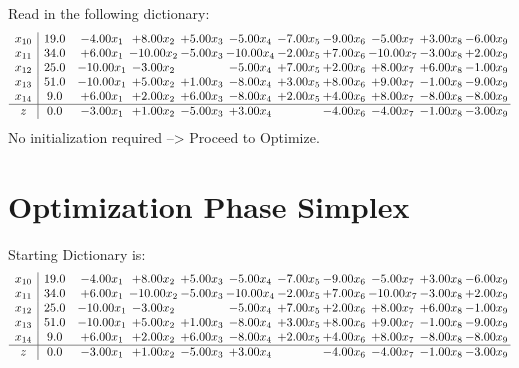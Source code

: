 \documentclass[9pt]{article}
\begin{document}
Read in the following dictionary:
\[\begin{array}{c| c c@{\hskip 2pt} c@{\hskip 2pt} c@{\hskip 2pt} c@{\hskip 2pt} c@{\hskip 2pt} c@{\hskip 2pt} c@{\hskip 2pt} c@{\hskip 2pt} c@{\hskip 2pt} }
 x_{10}   &  19.0 & -4.00 x_{1} & +  8.00 x_{2} & +  5.00 x_{3} & -5.00 x_{4} & -7.00 x_{5} & -9.00 x_{6} & -5.00 x_{7} & +  3.00 x_{8} & -6.00 x_{9}\\
 x_{11}   &  34.0 & +  6.00 x_{1} & -10.00 x_{2} & -5.00 x_{3} & -10.00 x_{4} & -2.00 x_{5} & +  7.00 x_{6} & -10.00 x_{7} & -3.00 x_{8} & +  2.00 x_{9}\\
 x_{12}   &  25.0 & -10.00 x_{1} & -3.00 x_{2} &   & -5.00 x_{4} & +  7.00 x_{5} & +  2.00 x_{6} & +  8.00 x_{7} & +  6.00 x_{8} & -1.00 x_{9}\\
 x_{13}   &  51.0 & -10.00 x_{1} & +  5.00 x_{2} & +  1.00 x_{3} & -8.00 x_{4} & +  3.00 x_{5} & +  8.00 x_{6} & +  9.00 x_{7} & -1.00 x_{8} & -9.00 x_{9}\\
 x_{14}   &  9.0 & +  6.00 x_{1} & +  2.00 x_{2} & +  6.00 x_{3} & -8.00 x_{4} & +  2.00 x_{5} & +  4.00 x_{6} & +  8.00 x_{7} & -8.00 x_{8} & -8.00 x_{9}\\
\hline
z    &  0.0 & -3.00 x_{1} & +  1.00 x_{2} & -5.00 x_{3} & +  3.00 x_{4} &   & -4.00 x_{6} & -4.00 x_{7} & -1.00 x_{8} & -3.00 x_{9}\\
\end{array}\]
No initialization required --> Proceed to Optimize. 
\section{Optimization Phase Simplex}
Starting Dictionary is:
\[\begin{array}{c| c c@{\hskip 2pt} c@{\hskip 2pt} c@{\hskip 2pt} c@{\hskip 2pt} c@{\hskip 2pt} c@{\hskip 2pt} c@{\hskip 2pt} c@{\hskip 2pt} c@{\hskip 2pt} }
 x_{10}   &  19.0 & -4.00 x_{1} & +  8.00 x_{2} & +  5.00 x_{3} & -5.00 x_{4} & -7.00 x_{5} & -9.00 x_{6} & -5.00 x_{7} & +  3.00 x_{8} & -6.00 x_{9}\\
 x_{11}   &  34.0 & +  6.00 x_{1} & -10.00 x_{2} & -5.00 x_{3} & -10.00 x_{4} & -2.00 x_{5} & +  7.00 x_{6} & -10.00 x_{7} & -3.00 x_{8} & +  2.00 x_{9}\\
 x_{12}   &  25.0 & -10.00 x_{1} & -3.00 x_{2} &   & -5.00 x_{4} & +  7.00 x_{5} & +  2.00 x_{6} & +  8.00 x_{7} & +  6.00 x_{8} & -1.00 x_{9}\\
 x_{13}   &  51.0 & -10.00 x_{1} & +  5.00 x_{2} & +  1.00 x_{3} & -8.00 x_{4} & +  3.00 x_{5} & +  8.00 x_{6} & +  9.00 x_{7} & -1.00 x_{8} & -9.00 x_{9}\\
 x_{14}   &  9.0 & +  6.00 x_{1} & +  2.00 x_{2} & +  6.00 x_{3} & -8.00 x_{4} & +  2.00 x_{5} & +  4.00 x_{6} & +  8.00 x_{7} & -8.00 x_{8} & -8.00 x_{9}\\
\hline
z    &  0.0 & -3.00 x_{1} & +  1.00 x_{2} & -5.00 x_{3} & +  3.00 x_{4} &   & -4.00 x_{6} & -4.00 x_{7} & -1.00 x_{8} & -3.00 x_{9}\\
\end{array}\]
\end{document}
